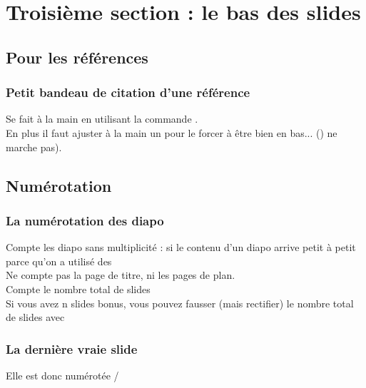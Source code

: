 \section{Troisième section : le bas des slides}
\subsection{Pour les références}
\begin{frame}[fragile]
\frametitle{Petit bandeau de citation d'une référence\esp}
	Se fait à la main en utilisant la commande \lin{\bandeauREF}.\\
	En plus il faut ajuster à la main un  \lin{\vspace} pour le forcer à être bien en bas... (\lin{\vfill}) ne marche pas).\\
	\vspace*{5cm}
\end{frame}







\subsection{Numérotation}
\begin{frame}[fragile]
\frametitle{La numérotation des diapo\esp}
Compte les diapo sans multiplicité : si le contenu d'un diapo arrive petit à petit parce qu'on a utilisé des %
\\[1cm]
Ne compte pas la page de titre, ni les pages de plan. \\[1cm]
Compte le nombre total de slides\\[1cm]
Si vous avez n slides bonus, vous pouvez fausser (mais rectifier) 
le nombre total de slides avec   
\end{frame}


\begin{frame}[fragile]
\frametitle{La dernière vraie slide\esp}
\label{derniere_slide_effective}
Elle est donc numérotée \theframenumber / \theframenumber
\end{frame}


